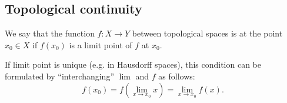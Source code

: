\subsection{Topological continuity}\label{subsec:topological_continuity}

\begin{definition}\label{def:function_continuous_at_point}
  We say that the function \( f: X \to Y \) between topological spaces is  at the point \( x_0 \in X \) if \( f(x_0) \) is a limit point of \( f \) at \( x_0 \).

  If limit point is unique (e.g. in Hausdorff spaces), this condition can be formulated by \enquote{interchanging} \( \lim \) and \( f \) as follows:
  \begin{equation*}
    f(x_0) = f\left( \lim_{x \to x_0} x \right) = \lim_{x \to x_0} f(x).
  \end{equation*}
\end{definition}

